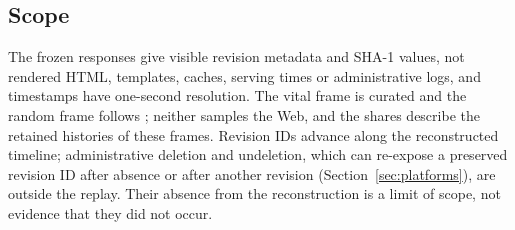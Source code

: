 \subsection{Scope}
The frozen responses give visible revision metadata and SHA-1 values, not
rendered HTML, templates, caches, serving times or administrative logs, and
timestamps have one-second resolution. The vital frame is curated and the
random frame follows ; neither samples the Web, and the shares
describe the retained histories of these frames. Revision IDs advance along
the reconstructed timeline; administrative deletion and undeletion, which can
re-expose a preserved revision ID after absence or after another revision
(Section~\ref{sec:platforms}), are outside the replay. Their absence from the
reconstruction is a limit of scope, not evidence that they did not occur.
